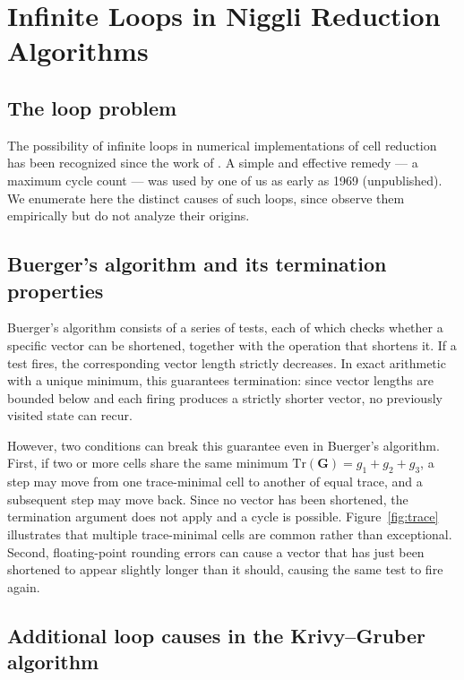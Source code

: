\documentclass[preprint]{iucr}              %
\numberwithin{equation}{section}
\begin{document}
	
	\section{Infinite Loops in Niggli Reduction Algorithms}
	\label{sec:loops}
	
	\subsection{The loop problem}
	
	The possibility of infinite loops in numerical implementations of
	cell reduction has been recognized since the work of
	. A simple and effective remedy --- a maximum
	cycle count --- was used by one of us as early as 1969 (unpublished).
	We enumerate here the distinct causes of such loops, since
	 observe them empirically but do
	not analyze their origins.
	
	\subsection{Buerger's algorithm and its termination properties}
	
	Buerger's algorithm consists of a series of tests, each of which
	checks whether a specific vector can be shortened, together with the
	operation that shortens it. If a test fires, the corresponding vector
	length strictly decreases. In exact arithmetic with a unique minimum,
	this guarantees termination: since vector lengths are bounded below
	and each firing produces a strictly shorter vector, no previously
	visited state can recur.
	
	However, two conditions can break this guarantee even in Buerger's
	algorithm. First, if two or more cells share the same minimum
	$\mathrm{Tr}(\mathbf{G}) = g_1 + g_2 + g_3$, a step may move from
	one trace-minimal cell to another of equal trace, and a subsequent
	step may move back. Since no vector has been shortened, the
	termination argument does not apply and a cycle is possible.
	Figure~\ref{fig:trace} illustrates that multiple trace-minimal
	cells are common rather than exceptional. Second, floating-point
	rounding errors can cause a vector that has just been shortened to
	appear slightly longer than it should, causing the same test to fire
	again.
	
	\subsection{Additional loop causes in the Krivy--Gruber algorithm}
	
\end{document}
